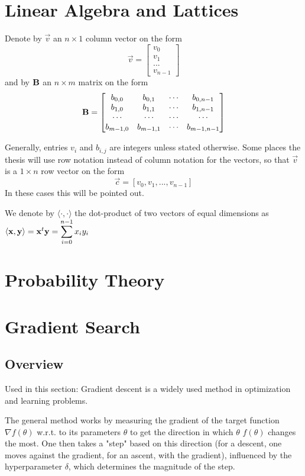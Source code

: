 \section{Linear Algebra and Lattices}
Denote by $\vec{v}$ an $n \times 1$ column vector on the form 
\[ \vec{v} = \begin{bmatrix} v_0 \\ v_1 \\ ... \\ v_{n-1} \end{bmatrix}\] and by $\mathbf{B}$ an $n \times m$ matrix on the form 
\[
    \mathbf{B} = 
    \begin{bmatrix}
        b_{0,0} & b_{0,1} & \cdots & b_{0, n-1} \\ 
        b_{1,0} & b_{1,1} & \cdots & b_{1, n-1} \\ 
        \cdots & \cdots & \cdots & \cdots\\
        b_{m-1,0} & b_{m-1,1} & \cdots & b_{m-1, n-1} \\ 
    \end{bmatrix}
\]

Generally, entries $v_i$ and $b_{i, j}$ are integers unless stated otherwise.
Some places the thesis will use row notation instead of column notation for the vectors, so that $\vec{v}$ is a $1 \times n$ row vector on the form
\[\vec{c} = [v_0, v_1, ..., v_{n-1}]\] In these cases this will be pointed out.

We denote by $\langle \cdot, \cdot \rangle$ the dot-product of two vectors of equal dimensions as \\
$\langle \vec{x}, \vec{y} \rangle = \vec{x}^t \vec{y} = \mathlarger{\sum_{i=0}^{n-1} x_i y_i}$
\section{Probability Theory}
\section{Gradient Search}
\subsection{Overview}
Used in this section: \cite{R17}
Gradient descent is a widely used method in optimization and learning problems.

The general method works by measuring the gradient of the target function $\nabla f (\theta) $ w.r.t. to its parameters $\theta$ to get the direction 
in which $\theta$ $f(\theta)$ changes the most. 
One then takes a "step" based on this direction (for a descent, one moves against the gradient, for an ascent, with the gradient), 
influenced by the hyperparameter $\delta$, which determines the magnitude of the step.

